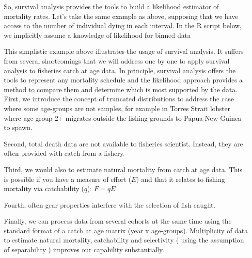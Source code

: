 So, survival analysis provides the tools to build a likelihood estimator of mortality rates. Let's take the same example as above, supposing that we have access to the number of individual dying in each interval. In the R script below, we implicitly assume a knowledge of likelihood for binned data \citep{cow98b}



This simplistic example above illustrates the usage of survival analysis. It suffers from several shortcomings that we will address one by one to apply survival analysis to fisheries catch at age data. In principle, survival analysis offers the tools to represent any mortality schedule and the likelihood approach provides a method to compare them and determine which is most supported by the data.\\

First, we introduce the concept of truncated distributions to address the case where some age-groups are not samples, for example in Torres Strait lobster where age-group 2+ migrates outside the fishing grounds to Papua New Guinea to spawn.



Second, total death data are not available to fisheries scientist. Instead, they are often provided with catch from a fishery. 



Third, we would also to estimate natural mortality from catch at age data. This is possible if you have a measure of effort ($E$) and that it relates to fishing mortality via catchability ($q$): $F=qE$



Fourth, often gear properties interfere with the selection of fish caught.


Finally, we can process data from several cohorts at the same time using the standard format of a catch at age matrix (year x age-groups). Multiplicity of data to estimate natural mortality, catchability and selectivity ( using the assumption of separability ) improves our capability substantially.






